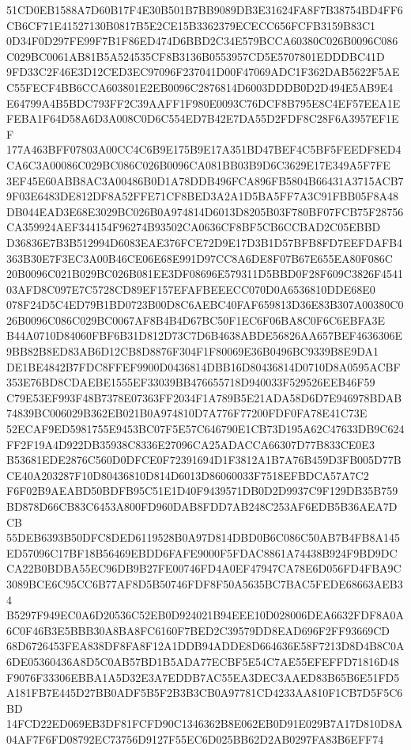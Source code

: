 \documentclass[UTF8,fontset=fandol,zihao=-4,a4paper]{ctexart}
\begin{document}
{{51CD0EB1588A7D60B17F4E30B501B7BB9089DB3E31624FA8F7B38754BD4FF6CB6CF71E41527130B0817B5E2CE15B3362379ECECC656FCFB3159B83C1
0D34F0D297FE99F7B1F86ED474D6BBD2C34E579BCCA60380C026B0096C086C029BC0061AB81B5A524535CF8B3136B0553957CD5E5707801EDDDBC41D
9FD33C2F46E3D12CED3EC97096F237041D00F47069ADC1F362DAB5622F5AEC55FECF4BB6CCA603801E2EB0096C2876814D6003DDDB0D2D494E5AB9E4
E64799A4B5BDC793FF2C39AAFF1F980E0093C76DCF8B795E8C4EF57EEA1EFEBA1F64D58A6D3A008C0D6C554ED7B42E7DA55D2FDF8C28F6A3957EF1EF
177A463BFF07803A00CC4C6B9E175B9E17A351BD47BEF4C5BF5FEEDF8ED4CA6C3A00086C029BC086C026B0096CA081BB03B9D6C3629E17E349A5F7FE
3EF45E60ABB8AC3A00486B0D1A78DDB496FCA896FB5804B66431A3715ACB79F03E6483DE812DF8A52FFE71CF8BED3A2A1D5BA5FF7A3C91FBB05F8A48
DB044EAD3E68E3029BC026B0A974814D6013D8205B03F780BF07FCB75F28756CA359924AEF344154F96274B93502CA0636CF8BF5CB6CCBAD2C05EBBD
D36836E7B3B512994D6083EAE376FCE72D9E17D3B1D57BFB8FD7EEFDAFB4363B30E7F3EC3A00B46CE06E68E991D97CC8A6DE8F07B67E655EA80F086C
20B0096C021B029BC026B081EE3DF08696E579311D5BBD0F28F609C3826F454103AFD8C097E7C5728CD89EF157EFAFBEEECC070D0A6536810DDE68E0
078F24D5C4ED79B1BD0723B00D8C6AEBC40FAF659813D36E83B307A00380C026B0096C086C029BC0067AF8B4B4D67BC50F1EC6F06BA8C0F6C6EBFA3E
B44A0710D84060FBF6B31D812D73C7D6B4638ABDE56826AA657BEF4636306E9BB82B8ED83AB6D12CB8D8876F304F1F80069E36B0496BC9339B8E9DA1
DE1BE4842B7FDC8FFEF9900D0436814DBB16D80436814D0710D8A0595ACBF353E76BD8CDAEBE1555EF33039BB476655718D940033F529526EEB46F59
C79E53EF993F48B7378E07363FF2034F1A789B5E21ADA58D6D7E946978BDAB74839BC006029B362EB021B0A974810D7A776F77200FDF0FA78E41C73E
52ECAF9ED5981755E9453BC07F5E57C646790E1CB73D195A62C47633DB9C624FF2F19A4D922DB35938C8336E27096CA25ADACCA66307D77B833CE0E3
B53681EDE2876C560D0DFCE0F72391694D1F3812A1B7A76B459D3FB005D77BCE40A203287F10D80436810D814D6013D86060033F7518EFBDCA57A7C2
F6F02B9AEABD50BDFB95C51E1D40F9439571DB0D2D9937C9F129DB35B759BD878D66CB83C6453A800FD960DAB8FDD7AB248C253AF6EDB5B36AEA7DCB
55DEB6393B50DFC8DED6119528B0A97D814DBD0B6C086C50AB7B4FB8A145ED57096C17BF18B56469EBDD6FAFE9000F5FDAC8861A74438B924F9BD9DC
CA22B0BDBA55EC96DB9B27FE00746FD4A0EF47947CA78E6D056FD4FBA9C3089BCE6C95CC6B77AF8D5B50746FDF8F50A5635BC7BAC5FEDE68663AEB34
B5297F949EC0A6D20536C52EB0D924021B94EEE10D028006DEA6632FDF8A0A6C0F46B3E5BBB30A8BA8FC6160F7BED2C39579DD8EAD696F2FF93669CD
68D6726453FEA838DF8FA8F12A1DDB94ADDE8D664636E58F7213D8D4B8C0A6DE05360436A8D5C0AB57BD1B5ADA77ECBF5E54C7AE55EFEFFD71816D48
F9076F33306EBBA1A5D32E3A7EDDB7AC55EA3DEC3AAED83B65B6E51FD5A181FB7E445D27BB0ADF5B5F2B3B3CB0A97781CD4233AA810F1CB7D5F5C6BD
14FCD22ED069EB3DF81FCFD90C1346362B8E062EB0D91E029B7A17D810D8A04AF7F6FD08792EC73756D9127F55EC6D025BB62D2AB0297FA83B6EFF74
}}
\end{document}
